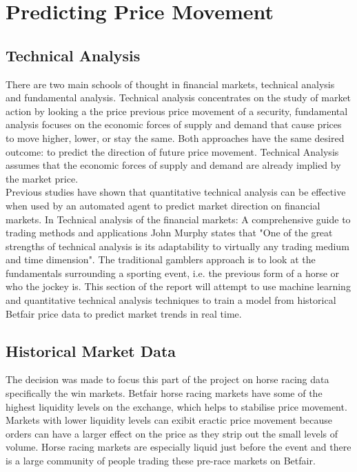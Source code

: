 \chapter{Predicting Price Movement}
	\section{Technical Analysis}
		There are two main schools of thought in financial markets, technical analysis and fundamental analysis. Technical analysis concentrates on the study of market action by looking a the price previous price movement of a security, fundamental analysis focuses on the economic forces of supply and demand that cause prices to move higher, lower, or stay the same\cite{murphy1999technical}. Both approaches have the same desired outcome: to predict the direction of future price movement. Technical Analysis assumes that the economic forces of supply and demand are already implied by the market price.\\
		
		Previous studies have shown that quantitative technical analysis can be effective when used by an automated agent to predict market direction on financial markets\cite{schoreels2004agent}. In Technical analysis of the financial markets: A comprehensive guide to trading methods and applications\cite{murphy1999technical} John Murphy states that "One of the great strengths of technical analysis is its adaptability to virtually any trading medium and time dimension". The traditional gamblers approach is to look at the fundamentals surrounding a sporting event, i.e. the previous form of a horse or who the jockey is. This section of the report will attempt to use machine learning and quantitative technical analysis techniques to train a model from historical Betfair price data to predict market trends in real time.
		
	\section{Historical Market Data}
		The decision was made to focus this part of the project on horse racing data specifically the win markets. Betfair horse racing markets have some of the highest liquidity levels on the exchange, which helps to stabilise price movement. Markets with lower liquidity levels can exibit eractic price movement because orders can have a larger effect on the price as they strip out the small levels of volume. Horse racing markets are especially liquid just before the event and there is a large community of people trading these pre-race markets on Betfair.\cite{coldTradingOnBetfair}\cite{googleSearchHorseRacing}\\
		
